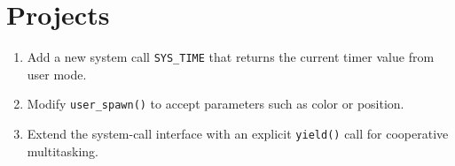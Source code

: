 \section*{Projects}

\begin{enumerate}
  \item Add a new system call \texttt{SYS\_TIME} that returns the current timer
        value from user mode.
  \item Modify \texttt{user\_spawn()} to accept parameters such as color or
        position.
  \item Extend the system-call interface with an explicit \texttt{yield()}
        call for cooperative multitasking.
\end{enumerate}
